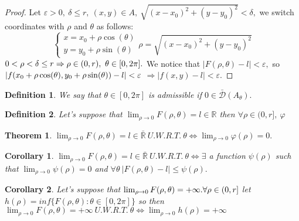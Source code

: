 \documentclass{article}
\newtheorem{theorem}{Theorem}
\newtheorem{corollary}{Corollary}
\newtheorem{definition}{Definition}
\begin{document}
\begin{proof}
        Let $\varepsilon > 0, \ \delta \leq r, \ (x,y) \in A, \ \sqrt{(x - x_0)^2 + (y - y_0)^2} < \delta,$ we switch coordinates with $\rho$ and $\theta$ as follows:
            \begin{equation*}
                \begin{cases}
                    x = x_0 + \rho \cos(\theta) \\
                    y = y_0 + \rho \sin(\theta)  
                \end{cases} \rho = \sqrt{(x - x_0)^2 + (y - y_0)^2} 
            \end{equation*}
        $0< \rho < \delta \leq r \Rightarrow \rho \in (0,r), \ \theta \in [0,2\pi]. \\$ 
        We notice that $ \left\lvert F(\rho, \theta) - l \right\rvert < \varepsilon,$ so $ \left\lvert f(x_0 + \rho \cos(\theta), y_0 + \rho \sin(\theta)) - l \right\rvert < \varepsilon \\$
        $ \Rightarrow  \left\lvert f(x,y) - l \right\rvert < \varepsilon.$
    \end{proof}
    \begin{definition}
        We say that $\theta \in [0,2\pi]$ is admissible if $ 0\in \bar{\mathcal{D}}(A_\theta).$
    \end{definition}
    \begin{definition}
        Let's suppose that $\lim_{\rho \to 0} F(\rho, \theta) = l \in \mathbb{R}$ then $\forall \rho \in (0,r], \ \varphi$
    \end{definition}
    \begin{theorem}
        $\lim_{\rho \to 0} F(\rho, \theta) = l \in \bar{\mathbb{R}} \ U.W.R.T. \ \theta \Longleftrightarrow \lim_{\rho \to 0 } \varphi(\rho) = 0.$
    \end{theorem}
    \begin{corollary}
        $\lim_{\rho \to 0} F(\rho, \theta) = l \in \bar{\mathbb{R}} \ U.W.R.T. \ \theta \Longleftrightarrow \exists$ a function $\psi(\rho)$ such that $\lim_{\rho \to 0} \psi(\rho) = 0$ and $\forall \theta \ \left\lvert F(\rho, \theta) - l\right\rvert \leqslant \psi(\rho).$
    \end{corollary}
    \begin{corollary}
        Let's suppose that $\lim_{\rho \to 0} F(\rho, \theta) = +\infty. \\ \forall \rho \in (0,r]$ let $h(\rho) = inf\{F(\rho, \theta) : \theta \in [0,2\pi] \}$ so then $\lim_{\rho \to 0} F(\rho, \theta) = +\infty \ U.W.R.T. \ \theta \Longleftrightarrow \lim_{\rho \to 0} h(\rho) = +\infty $
    \end{corollary}
\end{document}
